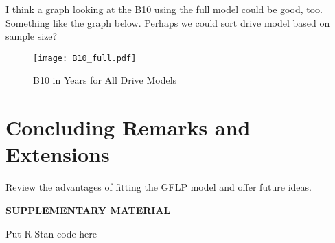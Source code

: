 \documentclass[12pt]{article}
\begin{document}
I think a graph looking at the B10 using the full model could be good, too.  Something like the graph below.  Perhaps we could sort drive model based on sample size?

\begin{figure}[H]
    \centering
   \texttt{[image: B10\_full.pdf]}
		\caption{B10 in Years for All Drive Models \label{fig:first}} 
\end{figure}

\section{Concluding Remarks and Extensions}
Review the advantages of fitting the GFLP model and offer future ideas.  




    


\bigskip
\begin{center}
{\large\bf SUPPLEMENTARY MATERIAL}
\end{center}

\begin{description}

\item Put R Stan code here

\end{description}



\end{document}
